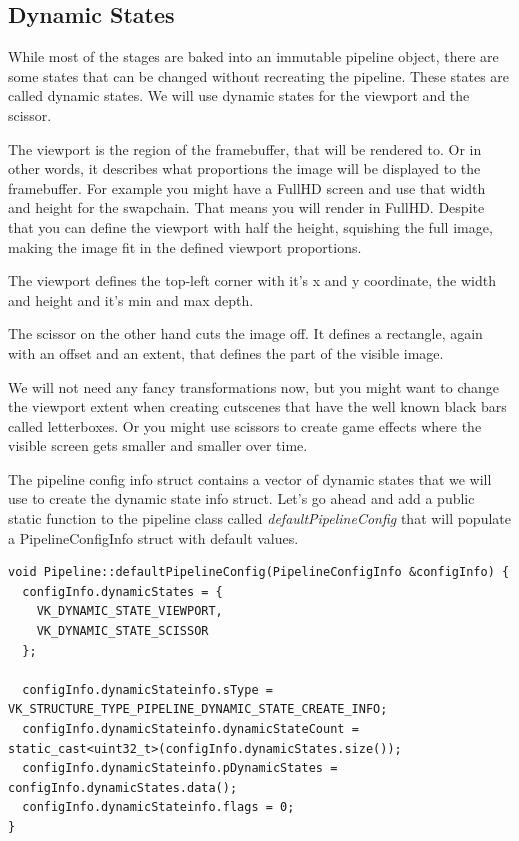 \documentclass[12pt]{report} \usepackage{preamble}
\begin{document}
\subsection{Dynamic States}

While most of the stages are baked into an immutable pipeline object, there are some states that can be changed without
recreating the pipeline. These states are called dynamic states. We will use dynamic states for the viewport and the scissor.

The viewport is the region of the framebuffer, that will be rendered to. Or in other words, it describes what proportions the image
will be displayed to the framebuffer. For example you might have a FullHD screen and use that width and height for the swapchain.
That means you will render in FullHD. Despite that you can define the viewport with half the height, squishing the full image, making
the image fit in the defined viewport proportions.

The viewport defines the top-left corner with it's x and y coordinate,
the width and height and it's min and max depth.

The scissor on the other hand cuts the image off. It defines a rectangle, again with an offset and an extent, that
defines the part of the visible image.

We will not need any fancy transformations now, but you might want to change the viewport extent when creating cutscenes
that have the well known black bars called letterboxes. Or you might use scissors to create game effects where the visible
screen gets smaller and smaller over time.

The pipeline config info struct contains a vector of dynamic states that we will use to create the dynamic state info struct.
Let's go ahead and add a public static function to the pipeline class called \textit{defaultPipelineConfig} that will populate a
PipelineConfigInfo struct with default values.

\begin{lstlisting}[Language=C++]
void Pipeline::defaultPipelineConfig(PipelineConfigInfo &configInfo) {
  configInfo.dynamicStates = {
    VK_DYNAMIC_STATE_VIEWPORT,
    VK_DYNAMIC_STATE_SCISSOR
  };

  configInfo.dynamicStateinfo.sType = VK_STRUCTURE_TYPE_PIPELINE_DYNAMIC_STATE_CREATE_INFO;
  configInfo.dynamicStateinfo.dynamicStateCount = static_cast<uint32_t>(configInfo.dynamicStates.size());
  configInfo.dynamicStateinfo.pDynamicStates = configInfo.dynamicStates.data();
  configInfo.dynamicStateinfo.flags = 0;
}
\end{lstlisting}
\end{document}
